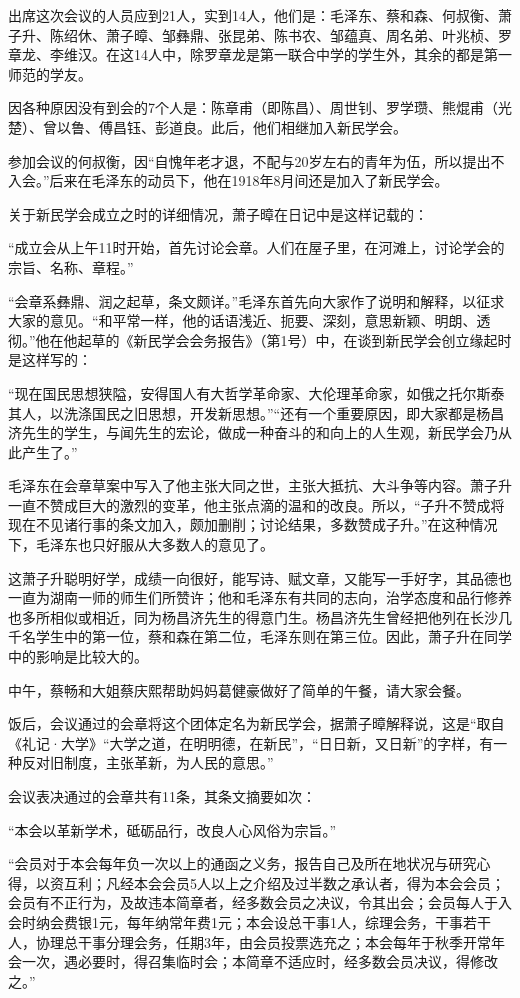 \documentclass[../../dazhuan.tex]{subfiles}
\begin{document}
出席这次会议的人员应到21人，实到14人，他们是：毛泽东、蔡和森、何叔衡、萧子升、陈绍休、萧子暲、邹彝鼎、张昆弟、陈书农、邹蕴真、周名弟、叶兆桢、罗章龙、李维汉。在这14人中，除罗章龙是第一联合中学的学生外，其余的都是第一师范的学友。

因各种原因没有到会的7个人是：陈章甫（即陈昌）、周世钊、罗学瓒、熊焜甫（光楚）、曾以鲁、傅昌钰、彭道良。此后，他们相继加入新民学会。

参加会议的何叔衡，因“自愧年老才退，不配与20岁左右的青年为伍，所以提出不入会。”后来在毛泽东的动员下，他在1918年8月间还是加入了新民学会。

关于新民学会成立之时的详细情况，萧子暲在日记中是这样记载的：

“成立会从上午11时开始，首先讨论会章。人们在屋子里，在河滩上，讨论学会的宗旨、名称、章程。”

“会章系彝鼎、润之起草，条文颇详。”毛泽东首先向大家作了说明和解释，以征求大家的意见。“和平常一样，他的话语浅近、扼要、深刻，意思新颖、明朗、透彻。”他在他起草的《新民学会会务报告》（第1号）中，在谈到新民学会创立缘起时是这样写的：

“现在国民思想狭隘，安得国人有大哲学革命家、大伦理革命家，如俄之托尔斯泰其人，以洗涤国民之旧思想，开发新思想。”“还有一个重要原因，即大家都是杨昌济先生的学生，与闻先生的宏论，做成一种奋斗的和向上的人生观，新民学会乃从此产生了。”

毛泽东在会章草案中写入了他主张大同之世，主张大抵抗、大斗争等内容。萧子升一直不赞成巨大的激烈的变革，他主张点滴的温和的改良。所以，“子升不赞成将现在不见诸行事的条文加入，颇加删削；讨论结果，多数赞成子升。”在这种情况下，毛泽东也只好服从大多数人的意见了。

这萧子升聪明好学，成绩一向很好，能写诗、赋文章，又能写一手好字，其品德也一直为湖南一师的师生们所赞许；他和毛泽东有共同的志向，治学态度和品行修养也多所相似或相近，同为杨昌济先生的得意门生。杨昌济先生曾经把他列在长沙几千名学生中的第一位，蔡和森在第二位，毛泽东则在第三位。因此，萧子升在同学中的影响是比较大的。

中午，蔡畅和大姐蔡庆熙帮助妈妈葛健豪做好了简单的午餐，请大家会餐。

饭后，会议通过的会章将这个团体定名为新民学会，据萧子暲解释说，这是“取自《礼记·大学》“大学之道，在明明德，在新民”，“日日新，又日新”的字样，有一种反对旧制度，主张革新，为人民的意思。” 

会议表决通过的会章共有11条，其条文摘要如次：

“本会以革新学术，砥砺品行，改良人心风俗为宗旨。”

“会员对于本会每年负一次以上的通函之义务，报告自己及所在地状况与研究心得，以资互利；凡经本会会员5人以上之介绍及过半数之承认者，得为本会会员；会员有不正行为，及故违本简章者，经多数会员之决议，令其出会；会员每人于入会时纳会费银1元，每年纳常年费1元；本会设总干事1人，综理会务，干事若干人，协理总干事分理会务，任期3年，由会员投票选充之；本会每年于秋季开常年会一次，遇必要时，得召集临时会；本简章不适应时，经多数会员决议，得修改之。”
\end{document}
